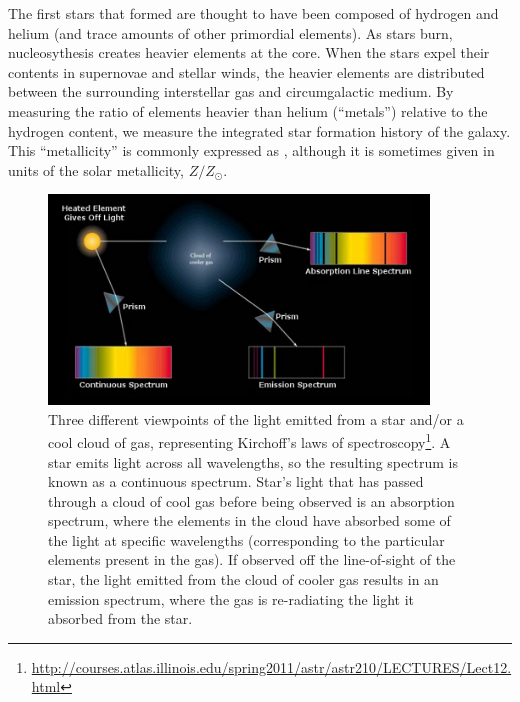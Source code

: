 
The first stars that formed are thought to have been composed of hydrogen and 
helium (and trace amounts of other primordial elements).  As stars burn, 
nucleosythesis creates heavier elements at the core.  When the stars expel their 
contents in supernovae and stellar winds, the heavier elements are distributed 
between the surrounding interstellar gas and circumgalactic medium.  By 
measuring the ratio of elements heavier than helium (``metals'') relative to the 
hydrogen content, we measure the integrated star formation history of the 
galaxy.  This ``metallicity'' is commonly expressed as \OH, although it is 
sometimes given in units of the solar metallicity, $Z/Z_\odot$.

\begin{figure}
    \includegraphics[width=0.9\textwidth]{Images/Intro/Kirchoff}
    \caption[Kirchoff's laws of spectroscopy]{Three different viewpoints of the 
    light emitted from a star and/or a cool cloud of gas, representing 
    Kirchoff's laws of 
    spectroscopy\footnote{\url{http://courses.atlas.illinois.edu/spring2011/astr/astr210/LECTURES/Lect12.html}}.  
    A star emits light across all wavelengths, so the resulting spectrum is 
    known as a continuous spectrum.  Star's light that has passed through a 
    cloud of cool gas before being observed is an absorption spectrum, where the 
    elements in the cloud have absorbed some of the light at specific 
    wavelengths (corresponding to the particular elements present in the gas).  
    If observed off the line-of-sight of the star, the light emitted from the 
    cloud of cooler gas results in an emission spectrum, where the gas is 
    re-radiating the light it absorbed from the star.}
    \label{fig:Kirchoff}
\end{figure}

